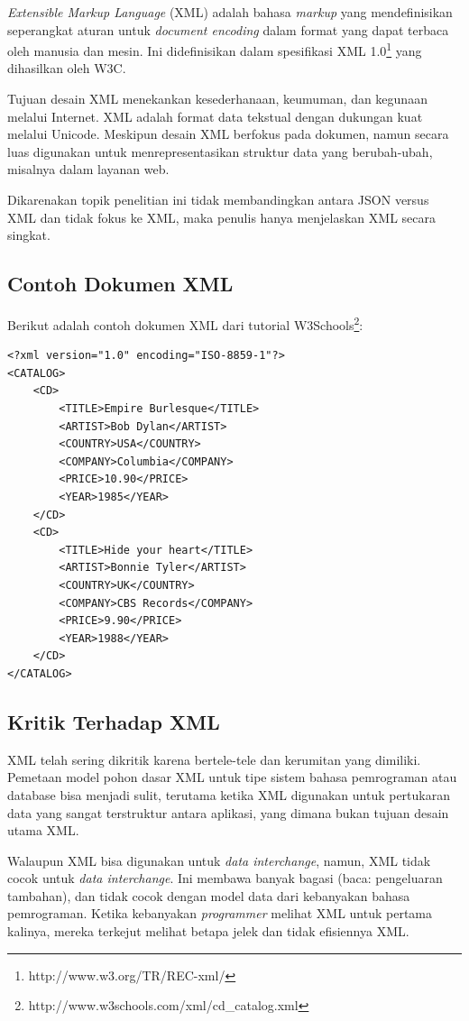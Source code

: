 \documentclass[a4paper, 12pt]{report}
\begin{document}
\onehalfspacing \textit{Extensible Markup Language} (XML) adalah bahasa \textit{markup} yang mendefinisikan seperangkat aturan untuk \textit{document encoding} dalam format yang dapat terbaca oleh manusia dan mesin. Ini didefinisikan dalam spesifikasi XML 1.0\footnote{http://www.w3.org/TR/REC-xml/} yang dihasilkan oleh W3C\cite{xml-wikipedia}.

\onehalfspacing Tujuan desain XML menekankan kesederhanaan, keumuman, dan kegunaan melalui Internet. XML adalah format data tekstual dengan dukungan kuat melalui Unicode. Meskipun desain XML berfokus pada dokumen, namun secara luas digunakan untuk menrepresentasikan struktur data yang berubah-ubah, misalnya dalam layanan web\cite{xml-wikipedia}.

\onehalfspacing Dikarenakan topik penelitian ini tidak membandingkan antara JSON versus XML dan tidak fokus ke XML, maka penulis hanya menjelaskan XML secara singkat.

\subsection{Contoh Dokumen XML}
\onehalfspacing Berikut adalah contoh dokumen XML dari tutorial W3Schools\footnote{http://www.w3schools.com/xml/cd\_catalog.xml}:

\begin{lstlisting}[frame=single]
<?xml version="1.0" encoding="ISO-8859-1"?>
<CATALOG>
	<CD>
		<TITLE>Empire Burlesque</TITLE>
		<ARTIST>Bob Dylan</ARTIST>
		<COUNTRY>USA</COUNTRY>
		<COMPANY>Columbia</COMPANY>
		<PRICE>10.90</PRICE>
		<YEAR>1985</YEAR>
	</CD>
	<CD>
		<TITLE>Hide your heart</TITLE>
		<ARTIST>Bonnie Tyler</ARTIST>
		<COUNTRY>UK</COUNTRY>
		<COMPANY>CBS Records</COMPANY>
		<PRICE>9.90</PRICE>
		<YEAR>1988</YEAR>
	</CD>
</CATALOG>
\end{lstlisting}

\subsection{Kritik Terhadap XML}

\onehalfspacing XML telah sering dikritik karena bertele-tele dan kerumitan yang dimiliki. Pemetaan model pohon dasar XML untuk tipe sistem bahasa pemrograman atau database bisa menjadi sulit, terutama ketika XML digunakan untuk pertukaran data yang sangat terstruktur antara aplikasi, yang dimana bukan tujuan desain utama XML.\cite{xml-wikipedia}

\onehalfspacing Walaupun XML bisa digunakan untuk \textit{data interchange}, namun, XML tidak cocok untuk \textit{data interchange}. Ini membawa banyak bagasi (baca: pengeluaran tambahan), dan tidak cocok dengan model data dari kebanyakan bahasa pemrograman. Ketika kebanyakan \textit{programmer} melihat XML untuk pertama kalinya, mereka terkejut melihat betapa jelek dan tidak efisiennya XML\cite{json-fat-free}.
\end{document}
